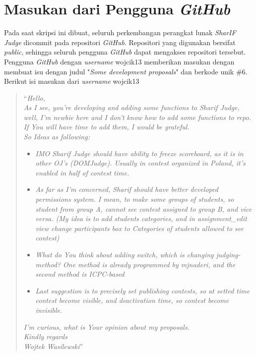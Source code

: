 \section{Masukan dari Pengguna \textit{GitHub}}
\label{sec:masukangithub}
Pada saat skripsi ini dibuat, seluruh perkembangan perangkat lunak \textit{SharIF Judge} dicommit pada repositori \textit{GitHub}. Repositori yang digunakan bersifat \textit{public}, sehingga seluruh pengguna \textit{GitHub} dapat mengakses repositori tersebut. Pengguna \textit{GitHub} dengan \textit{username} wojcik13 memberikan masukan dengan membuat isu dengan judul "\textit{Some development proposals}" dan berkode unik \#6. Berikut isi masukan dari \textit{username} wojcik13
\begin{quote}
	``\textit{Hello,} \\
	\textit{As I see, you're developing and adding some functions to Sharif Judge, well, I'm newbie here and I don't know how to add some functions to repo. If You will have time to add them, I would be grateful.}\\
	\textit{So Ideas as following:} 
	\begin{itemize}
		\item \textit{IMO Sharif Judge should have ability to freeze scoreboard, as it is in other OJ's (DOMJudge). Usually in contest organized in Poland, it's enabled in half of contest time. }
		\item \textit{As far as I'm concerned, Sharif should have better developed permissions system. I mean, to make some groups of students, so student from group A, cannot see contest assigned to group B, and vice versa. (My idea is to add students categories, and in assignment\_edit view change participants box to Categories of students allowed to see contest) }
		\item \textit{What do You think about adding switch, which is changing judging-method? One method is already programmed by mjnaderi, and the second method is ICPC-based }
		\item \textit{Last suggestion is to precisely set publishing contests, so at setted time contest become visible, and deactivation time, so contest become invisible.}
	\end{itemize}
	\textit{I'm curious, what is Your opinion about my proposals.}\\
	\textit{Kindly regards}\\
	\textit{Wojtek Wasilewski}''
\end{quote}

